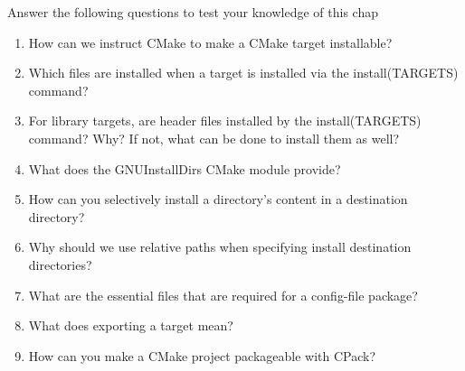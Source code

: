 Answer the following questions to test your knowledge of this chap

\begin{enumerate}
\item 
How can we instruct CMake to make a CMake target installable?

\item 
Which files are installed when a target is installed via the install(TARGETS) command?

\item 
For library targets, are header files installed by the install(TARGETS) command? Why? If not, what can be done to install them as well?

\item 
What does the GNUInstallDirs CMake module provide?

\item 
How can you selectively install a directory's content in a destination directory?

\item 
Why should we use relative paths when specifying install destination directories?

\item 
What are the essential files that are required for a config-file package?

\item 
What does exporting a target mean?

\item 
How can you make a CMake project packageable with CPack?
\end{enumerate}